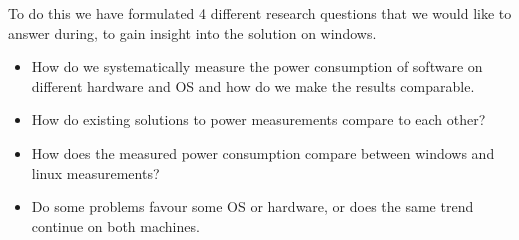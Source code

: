 To do this we have formulated 4 different research questions that we would like to answer during, to gain insight into the solution on windows.

\begin{itemize}
    \item How do we systematically measure the power consumption of software on different hardware and OS and how do we make the results comparable.
    \item How do existing solutions to power measurements compare to each other?
    \item How does the measured power consumption compare between windows and linux measurements?
    \item Do some problems favour some OS or hardware, or does the same trend continue on both machines.
\end{itemize}



